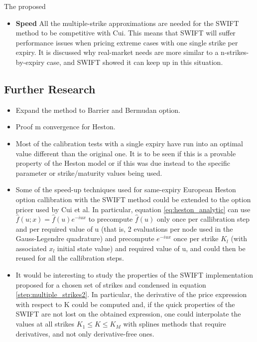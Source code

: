 \documentclass[12,twoside]{mammeTFM}
\theoremstyle{definition}
\theoremstyle{remark}
\begin{document}
The proposed 

\begin{itemize}

\item \textbf{Speed}
All the multiple-strike approximations are needed for the SWIFT method to be competitive with Cui. This means that SWIFT will suffer performance issues when pricing extreme cases with one single strike per expiry. It is discussed why real-market needs are more similar to a n-strikes-by-expiry case, and SWIFT showed it can keep up in this situation.

\end{itemize}

\subsection{Further Research}
\begin{itemize}

\item Expand the method to Barrier and Bermudan option.

\item Proof m convergence for Heston.

\item Most of the calibration tests with a single expiry have run into an optimal value different than the original one. It is to be seen if this is a provable property of the Heston model or if this was due instead to the specific parameter or strike/maturity values being used.

\item Some of the speed-up techniques used for same-expiry European Heston option callibration with the SWIFT method could be extended to the option pricer used by Cui et al. In particular, equation \ref{eq:heston_analytic} can use $\hat{f}(u; x) = \hat{f}(u) e^{-i u x}$ to precompute $\hat{f}(u)$ only once per callibration step and per required value of u (that is, 2 evaluations per node used in the Gauss-Legendre quadrature) and precompute $e^{-i u x}$ once per strike $K_l$ (with associated $x_l$ initial state value) and required value of u, and could then be reused for all the callibration steps.

\item It would be interesting to study the properties of the SWIFT implementation proposed for a chosen set of strikes and condensed in equation \ref{step:multiple_strikes2}. In particular, the derivative of the price expression with respect to K could be computed and, if the quick properties of the SWIFT are not lost on the obtained expression, one could interpolate the values at all strikes $K_1 \leq K \leq K_M$ with splines methods that require derivatives, and not only derivative-free ones.

\end{itemize}
\end{document}
